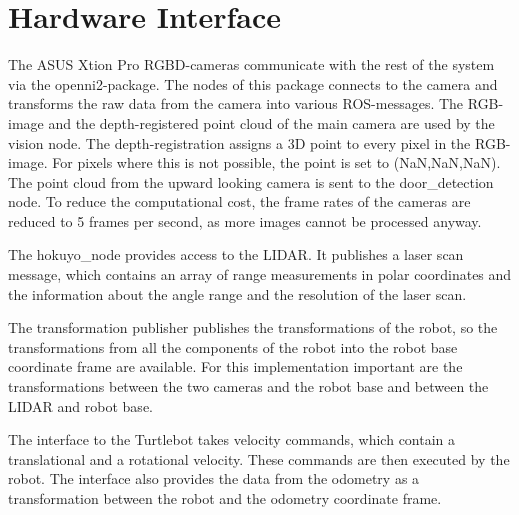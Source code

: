 \section{Hardware Interface}

The ASUS Xtion Pro RGBD-cameras communicate with the rest of the system via the openni2-package. The nodes of this package connects to the camera and transforms the raw data from the camera into various ROS-messages. The RGB-image and the depth-registered point cloud of the main camera are used by the vision node. The depth-registration assigns a 3D point to every pixel in the RGB-image. For pixels where this is not possible, the point is set to (NaN,NaN,NaN). The point cloud from the upward looking camera is sent to the door{\_}detection node. To reduce the computational cost, the frame rates of the cameras are reduced to 5 frames per second, as more images cannot be processed anyway.

The hokuyo{\_}node provides access to the LIDAR. It publishes a laser scan message, which contains an array of range measurements in polar coordinates and the information about the angle range and the resolution of the laser scan.

The transformation publisher publishes the transformations of the robot, so the transformations from all the components of the robot into the robot base coordinate frame are available. For this implementation important are the transformations between the two cameras and the robot base and between the LIDAR and robot base. 

The interface to the Turtlebot takes velocity commands, which contain a translational and a rotational velocity. These commands are then executed by the robot. The interface also provides the data from the odometry as a transformation between the robot and the odometry coordinate frame. 